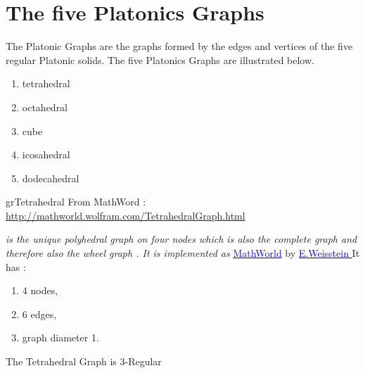 \newpage\section{ The five Platonics Graphs}

The Platonic Graphs are the graphs formed by the edges and vertices of the five regular Platonic solids. The five Platonics Graphs  are illustrated below.  

\begin{enumerate}
  \item tetrahedral
  \item octahedral
  \item cube
  \item icosahedral
  \item dodecahedral
\end{enumerate} 


\begin{NewMacroBox}{grTetrahedral}{}
From MathWord : \url{http://mathworld.wolfram.com/TetrahedralGraph.html} 

\emph{  is the unique polyhedral graph on four nodes which is also the complete graph  and therefore also the wheel graph . It is implemented as }
\href{http://mathworld.wolfram.com/TetrahedralGraph.html}%
           {\textcolor{blue}{MathWorld}} by \href{http://en.wikipedia.org/wiki/Eric_W._Weisstein}%
           {\textcolor{blue}{E.Weisstein}
}
It has :

\begin{enumerate}
 \item  4 nodes,
 \item  6 edges,
 \item  graph diameter 1.
\end{enumerate}

The  Tetrahedral Graph is 3-Regular
\end{NewMacroBox}

\subsection{}
\begin{center}
\begin{tkzexample}[vbox]
\end{tkzexample} 
\end{center}

